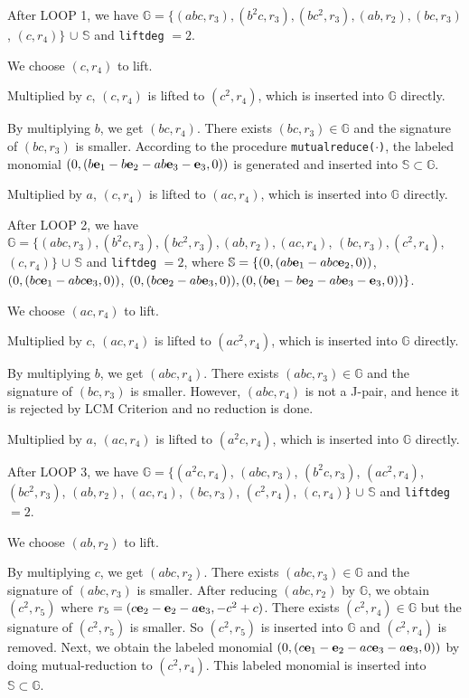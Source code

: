 \documentclass[final, number, 3p,12pt]{elsarticle}
\def\G{{\mathbb{G}}}
\def\S{{\mathbb{S}}}
\def\e{{\bf e}}
\begin{document}
After LOOP 1, we have $\G = \{(abc, r_3), (b^2c, r_3), (bc^2, r_3), (ab, r_2), (bc, r_3)$, $(c, r_4)\}$ $\cup$ $\S$ and {\tt liftdeg} $=2$.

 We choose $(c, r_4)$ to lift. 

Multiplied by $c$, $(c, r_4)$ is lifted to $(c^2, r_4)$, which is inserted into $\G$ directly. 

By multiplying $b$, we get $(bc, r_4)$. There exists $(bc, r_3) \in \G$ and the signature of $(bc, r_3)$ is smaller. According to the procedure {\tt mutualreduce($\cdot$)}, the labeled monomial $(0, (b\e_1 - b\e_2 -ab\e_3 - \e_3, 0))$ is generated and inserted into $\S \subset \G$.

Multiplied by $a$, $(c, r_4)$ is lifted to $(ac, r_4)$, which is inserted into $\G$ directly. 

After LOOP 2, we have $\G = \{(abc, r_3), (b^2c, r_3), (bc^2, r_3), (ab, r_2), (ac, r_4)$, $(bc, r_3), (c^2, r_4)$, $(c, r_4)\}$ $\cup$ $\S$ and {\tt liftdeg} $=2$, where $\S = \{(0, (ab\e_1 - abc\e_2, 0))$, $(0, (bc\e_1 - abc\e_3, 0))$, $(0, (bc\e_2 - ab\e_3, 0)), (0, (b\e_1 - b\e_2 -ab\e_3 - \e_3, 0))\}$. 


 We choose $(ac, r_4)$ to lift. 

Multiplied by $c$, $(ac, r_4)$ is lifted to $(ac^2, r_4)$, which is inserted into $\G$ directly. 

By multiplying $b$, we get $(abc, r_4)$. There exists $(abc, r_3) \in \G$ and the signature of $(bc, r_3)$ is smaller. However, $(abc, r_4)$ is not a J-pair, and hence it is rejected by LCM Criterion and no reduction is done.

Multiplied by $a$, $(ac, r_4)$ is lifted to $(a^2c, r_4)$, which is inserted into $\G$ directly. 

After LOOP 3, we have $\G = \{(a^2c, r_4)$, $(abc, r_3)$, $(b^2c, r_3)$, $(ac^2, r_4)$, $(bc^2, r_3)$, $(ab, r_2)$, $(ac, r_4)$, $(bc, r_3)$, $(c^2, r_4)$, $(c, r_4)\}$ $\cup$ $\S$ and {\tt liftdeg} $=2$. 




 We choose $(ab, r_2)$ to lift. 

By multiplying $c$, we get $(abc, r_2)$. There exists $(abc, r_3) \in \G$ and the signature of $(abc, r_3)$ is smaller. After reducing $(abc, r_2)$ by $\G$, we obtain $(c^2, r_5)$ where $r_5 = (c\e_2-\e_2-a\e_3, -c^2+c)$. There exists $(c^2, r_4) \in \G$ but the signature of $(c^2, r_5)$ is smaller. So $(c^2, r_5)$ is inserted into $\G$ and $(c^2, r_4)$ is removed. Next, we obtain the labeled monomial $(0, (c\e_1 - \e_2 - ac\e_3 - a\e_3, 0))$ by doing mutual-reduction to $(c^2, r_4)$. This labeled monomial is inserted into $\S \subset \G$.
\end{document}
